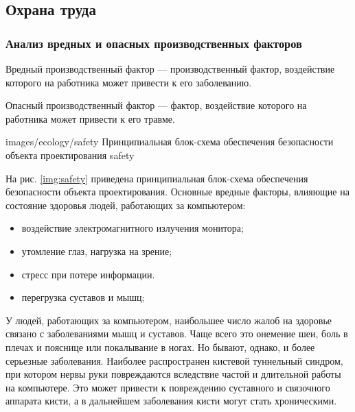\subsection{Охрана труда}
\subsubsection{Анализ вредных и опасных производственных факторов}
Вредный производственный фактор --- производственный фактор, воздействие которого на работника может привести к его заболеванию.

Опасный производственный фактор --- фактор, воздействие которого на работника может привести к его травме.

              {images/ecology/safety}
              {Принципиальная блок-схема обеспечения безопасности объекта проектирования}
              {safety}

На рис. \ref{img:safety} приведена принципиальная блок-схема обеспечения безопасности объекта проектирования.
Основные вредные факторы, влияющие на состояние здоровья людей, работающих за компьютером:
\begin{itemize}
  \item{воздействие электромагнитного излучения монитора;}
  \item{утомление глаз, нагрузка на зрение;}
  \item{стресс при потере информации.}
  \item{перегрузка суставов и мышц;}
\end{itemize}
У людей, работающих за компьютером, наибольшее число жалоб на здоровье связано с заболеваниями мышц и суставов.
Чаще всего это онемение шеи, боль в плечах и пояснице или покалывание в ногах. Но бывают, однако, и более серьезные заболевания. Наиболее распространен кистевой туннельный синдром, при котором нервы руки повреждаются вследствие частой и длительной работы на компьютере. Это может привести к повреждению суставного и связочного аппарата кисти, а в дальнейшем заболевания кисти могут стать хроническими.
